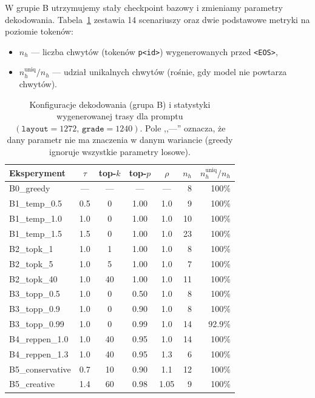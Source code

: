 \documentclass[12pt,a4paper]{article}
\begin{document}
W grupie B utrzymujemy stały checkpoint bazowy i zmieniamy parametry dekodowania. Tabela~\ref{tab:exp-gen} zestawia 14 scenariuszy oraz dwie podstawowe metryki na poziomie tokenów:
\begin{itemize}[leftmargin=1.5em]
    \item $n_h$ --- liczba chwytów (tokenów \texttt{p<id>}) wygenerowanych przed \texttt{<EOS>},
    \item $n_h^{\text{uniq}}/n_h$ --- udział unikalnych chwytów (rośnie, gdy model nie powtarza chwytów).
\end{itemize}

\begin{table}[H]
\centering
\caption{Konfiguracje dekodowania (grupa B) i statystyki wygenerowanej trasy dla promptu $(\texttt{layout}=1272,\,\texttt{grade}=1240)$. Pole ,,---'' oznacza, że dany parametr nie ma znaczenia w danym wariancie (greedy ignoruje wszystkie parametry losowe).}
\label{tab:exp-gen}
\small
\begin{tabular}{lccccrr}
\toprule
Eksperyment & $\tau$ & top-$k$ & top-$p$ & $\rho$ & $n_h$ & $n_h^{\text{uniq}}/n_h$ \\
\midrule
B0\_greedy        & ---  & ---  & ---  & ---  & 8  & 100\% \\
B1\_temp\_0.5     & 0.5  & 0    & 1.00 & 1.0  & 9  & 100\% \\
B1\_temp\_1.0     & 1.0  & 0    & 1.00 & 1.0  & 10 & 100\% \\
B1\_temp\_1.5     & 1.5  & 0    & 1.00 & 1.0  & 23 & 100\% \\
B2\_topk\_1       & 1.0  & 1    & 1.00 & 1.0  & 8  & 100\% \\
B2\_topk\_5       & 1.0  & 5    & 1.00 & 1.0  & 7  & 100\% \\
B2\_topk\_40      & 1.0  & 40   & 1.00 & 1.0  & 11 & 100\% \\
B3\_topp\_0.5     & 1.0  & 0    & 0.50 & 1.0  & 8  & 100\% \\
B3\_topp\_0.9     & 1.0  & 0    & 0.90 & 1.0  & 8  & 100\% \\
B3\_topp\_0.99    & 1.0  & 0    & 0.99 & 1.0  & 14 & 92.9\% \\
B4\_reppen\_1.0   & 1.0  & 40   & 0.95 & 1.0  & 14 & 100\% \\
B4\_reppen\_1.3   & 1.0  & 40   & 0.95 & 1.3  & 6  & 100\% \\
B5\_conservative  & 0.7  & 10   & 0.90 & 1.1  & 12 & 100\% \\
B5\_creative      & 1.4  & 60   & 0.98 & 1.05 & 9  & 100\% \\
\bottomrule
\end{tabular}
\end{table}
\end{document}
